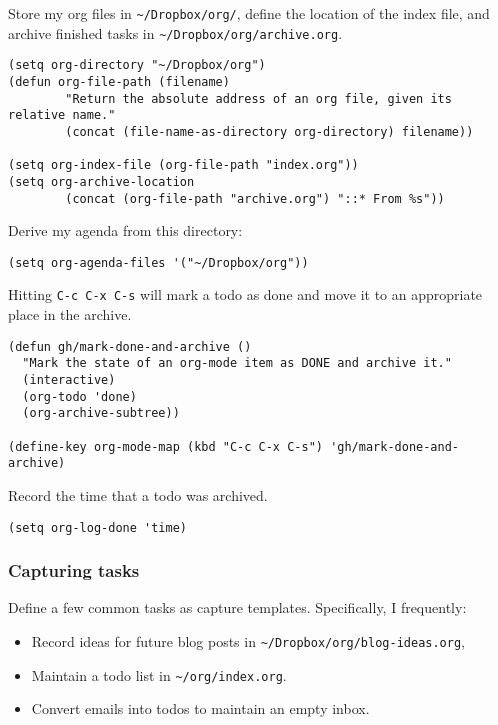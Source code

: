 \documentclass[11pt]{article}
\begin{document}
Store my org files in \texttt{\textasciitilde{}/Dropbox/org/}, define the location of the index file, and archive finished tasks in \texttt{\textasciitilde{}/Dropbox/org/archive.org}.

\begin{verbatim}
(setq org-directory "~/Dropbox/org")
(defun org-file-path (filename)
        "Return the absolute address of an org file, given its relative name."
        (concat (file-name-as-directory org-directory) filename))

(setq org-index-file (org-file-path "index.org"))
(setq org-archive-location
        (concat (org-file-path "archive.org") "::* From %s"))
\end{verbatim}

Derive my agenda from this directory:

\begin{verbatim}
(setq org-agenda-files '("~/Dropbox/org"))
\end{verbatim}

Hitting \texttt{C-c C-x C-s} will mark a todo as done and move it to an appropriate place in the archive.

\begin{verbatim}
(defun gh/mark-done-and-archive ()
  "Mark the state of an org-mode item as DONE and archive it."
  (interactive)
  (org-todo 'done)
  (org-archive-subtree))

(define-key org-mode-map (kbd "C-c C-x C-s") 'gh/mark-done-and-archive)
\end{verbatim}

Record the time that a todo was archived.

\begin{verbatim}
(setq org-log-done 'time)
\end{verbatim}


\subsubsection{Capturing tasks}
\label{sec:org7edb6c5}

Define a few common tasks as capture templates. Specifically, I frequently:

\begin{itemize}
\item Record ideas for future blog posts in \texttt{\textasciitilde{}/Dropbox/org/blog-ideas.org},
\item Maintain a todo list in \texttt{\textasciitilde{}/org/index.org}.
\item Convert emails into todos to maintain an empty inbox.
\end{itemize}
\end{document}
